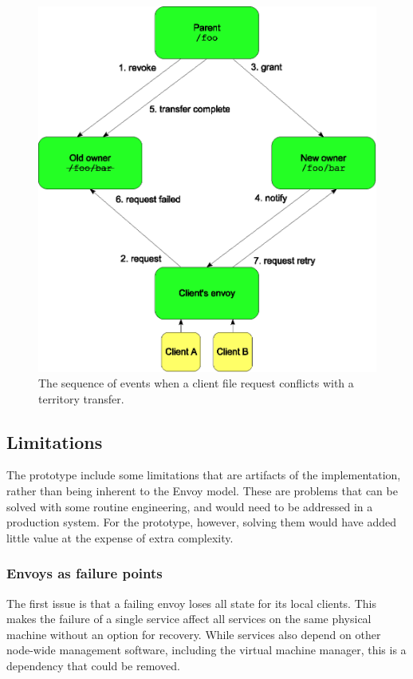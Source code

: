 \begin{figure}[tp]
\centering
\includegraphics[width=\figwidth]{figures/migrate-sync}
\caption[Sequence of events in a territory migration]{The sequence of events when a client file request conflicts with a territory transfer.}
\label{fig:migrate-sync}
\end{figure}

\subsection{Limitations}

The prototype include some limitations that are artifacts of the implementation, rather than being inherent to the Envoy model. These are problems that can be solved with some routine engineering, and would need to be addressed in a production system. For the prototype, however, solving them would have added little value at the expense of extra complexity.

\subsubsection{Envoys as failure points}

The first issue is that a failing envoy loses all state for its local clients. This makes the failure of a single service affect all services on the same physical machine without an option for recovery. While services also depend on other node-wide management software, including the virtual machine manager, this is a dependency that could be removed.

